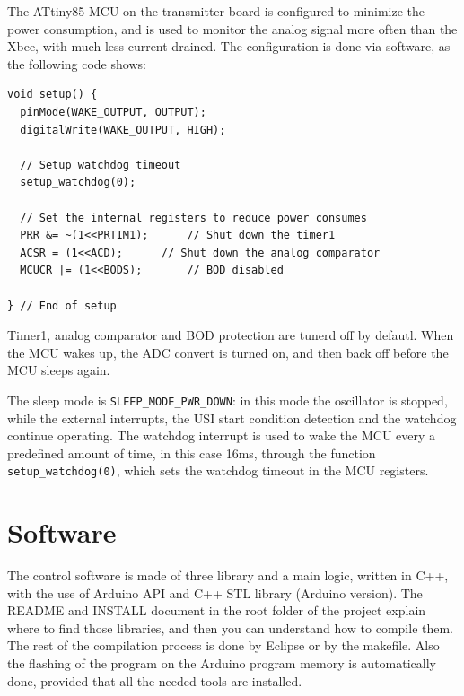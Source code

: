 \documentclass[11pt,english]{article}
\newcommand{\code}[1]{\texttt{#1}}
\begin{document}
The ATtiny85 MCU on the transmitter board is configured to minimize the power consumption, and is used to monitor the analog 
signal more often than the Xbee, with much less current drained.
The configuration is done via software, as the following code shows:
%
\begin{lstlisting}[label=lis:ATtiny-config,caption=ATtiny85V configuration]
void setup() {
  pinMode(WAKE_OUTPUT, OUTPUT);
  digitalWrite(WAKE_OUTPUT, HIGH);

  // Setup watchdog timeout
  setup_watchdog(0);

  // Set the internal registers to reduce power consumes
  PRR &= ~(1<<PRTIM1);		// Shut down the timer1
  ACSR = (1<<ACD);		// Shut down the analog comparator
  MCUCR |= (1<<BODS);		// BOD disabled

} // End of setup
\end{lstlisting}

Timer1, analog comparator and BOD protection are tunerd off by defautl. When the MCU wakes up, the ADC convert is turned on, 
and then back off before the MCU sleeps again.

The sleep mode is \code{SLEEP\_MODE\_PWR\_DOWN}: in this mode the oscillator is stopped, while the external interrupts, the USI 
start condition detection and the watchdog continue operating.
The watchdog interrupt is used to wake the MCU every a predefined amount of time, in this case 16ms, through the function 
\code{setup\_watchdog(0)}, which sets the watchdog timeout in the MCU registers.





\pagebreak

\section{Software}

The control software is made of three library and a main logic, written in C++, with the use of Arduino 
API and C++ STL library (Arduino version). The README and INSTALL document in the root folder of the 
project explain where to find those libraries, and then you can understand how to compile them. The 
rest of the compilation process is done by Eclipse or by the makefile. Also the flashing of the program 
on the Arduino program memory is automatically done, provided that all the needed tools are installed.
\end{document}
